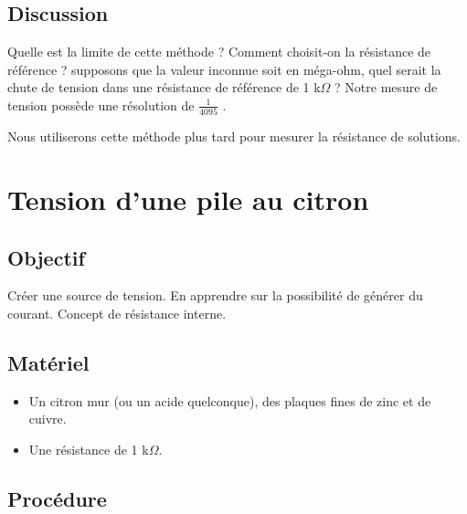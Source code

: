 \documentclass{book}
\begin{document}
\subsection{Discussion}


Quelle est la limite de cette méthode ? Comment choisit-on la résistance de référence ? supposons que la valeur inconnue soit en méga-ohm, quel serait la chute de tension dans une résistance de référence de 1 k$\Omega$ ? Notre mesure de tension possède une résolution de $\frac{1}{4095}$ .



Nous utiliserons cette méthode plus tard pour mesurer la résistance de solutions.










\section{Tension d'une pile au citron}



\subsection{Objectif}


Créer une source de tension. En apprendre sur la possibilité de générer du courant. Concept de résistance interne.




\subsection{Matériel}


\begin{itemize}
  \item Un citron mur (ou un acide quelconque), des plaques fines de zinc et de cuivre.
  \item Une résistance de 1 k$\Omega$.
\end{itemize}

\subsection{Procédure}
\end{document}
